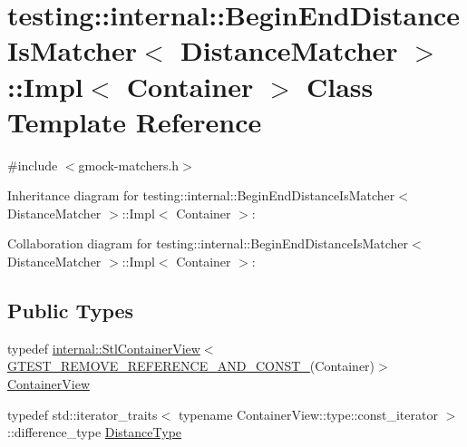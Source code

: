 \hypertarget{classtesting_1_1internal_1_1_begin_end_distance_is_matcher_1_1_impl}{}\section{testing\+:\+:internal\+:\+:Begin\+End\+Distance\+Is\+Matcher$<$ Distance\+Matcher $>$\+:\+:Impl$<$ Container $>$ Class Template Reference}
\label{classtesting_1_1internal_1_1_begin_end_distance_is_matcher_1_1_impl}


{\ttfamily \#include $<$gmock-\/matchers.\+h$>$}



Inheritance diagram for testing\+:\+:internal\+:\+:Begin\+End\+Distance\+Is\+Matcher$<$ Distance\+Matcher $>$\+:\+:Impl$<$ Container $>$\+:


Collaboration diagram for testing\+:\+:internal\+:\+:Begin\+End\+Distance\+Is\+Matcher$<$ Distance\+Matcher $>$\+:\+:Impl$<$ Container $>$\+:
\subsection*{Public Types}
\begin{DoxyCompactItemize}
\item 
typedef \hyperlink{classtesting_1_1internal_1_1_stl_container_view}{internal\+::\+Stl\+Container\+View}$<$ \hyperlink{gtest-internal_8h_a874567b176266188fabfffb8393267ce}{G\+T\+E\+S\+T\+\_\+\+R\+E\+M\+O\+V\+E\+\_\+\+R\+E\+F\+E\+R\+E\+N\+C\+E\+\_\+\+A\+N\+D\+\_\+\+C\+O\+N\+S\+T\+\_\+}(Container)$>$ \hyperlink{classtesting_1_1internal_1_1_begin_end_distance_is_matcher_1_1_impl_a5c76ede38c6143430f56e02e9024f535}{Container\+View}
\item 
typedef std\+::iterator\+\_\+traits$<$ typename Container\+View\+::type\+::const\+\_\+iterator $>$\+::difference\+\_\+type \hyperlink{classtesting_1_1internal_1_1_begin_end_distance_is_matcher_1_1_impl_a10d901c49e2793dae6bcce6fa1a4e9fe}{Distance\+Type}
\end{DoxyCompactItemize}
